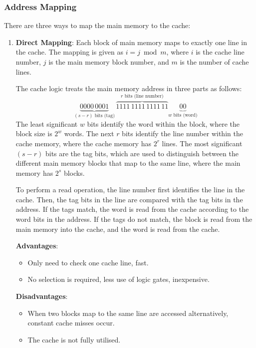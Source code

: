 \subsubsection{Address Mapping}

There are three ways to map the main memory to the cache:
\begin{enumerate}
\item \textbf{Direct Mapping}: 
    Each block of main memory maps to exactly one line in the cache. The mapping is
    given as $i = j \bmod m$, where $i$ is the cache line number, $j$ is the main memory
    block number, and $m$ is the number of cache lines.
    
    \begin{example}
        The cache logic treats the main memory address in three parts as follows:
        \begin{equation*}
            \underbrace{0000\,0001}_{(s-r)\text{ bits (tag)}}\,
            \overbrace{1111\,1111\,1111\,11}^{r\text{ bits (line number)}}
            \underbrace{00}_{w\text{ bits (word)}}
        \end{equation*}
        The least significant $w$ bits identify the word within the block,
        where the block size is $2^w$ words. The next $r$ bits identify the line
        number within the cache memory, where the cache memory has $2^r$ lines.
        The most significant $(s-r)$ bits are the tag bits, which are used to
        distinguish between the different main memory blocks that map to the same line,
        where the main memory has $2^s$ blocks.
    \end{example}

    To perform a read operation, the line number first identifies the line in the cache.
    Then, the tag bits in the line are compared with the tag bits in the address.
    If the tags match, the word is read from the cache according to the word bits in the
    address. If the tags do not match, the block is read from the main memory into the
    cache, and the word is read from the cache.

    \begin{multicols}{2}
        \textbf{Advantages}: \begin{itemize}
            \item Only need to check one cache line, fast.
            \item No selection is required, less use of logic gates, inexpensive.
        \end{itemize}
        \columnbreak
        \textbf{Disadvantages}: \begin{itemize}
            \item When two blocks map to the same line are accessed alternatively,
                constant cache misses occur.
            \item The cache is not fully utilised.
        \end{itemize}
    \end{multicols}


\end{enumerate}
